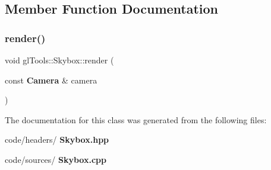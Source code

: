 \subsection{Member Function Documentation}
\mbox{\label{classgl_tools_1_1_skybox_a4e15b93af44e72e77e6128599357c161}} 
\subsubsection{render()}
{\footnotesize\ttfamily void gl\+Tools\+::\+Skybox\+::render (\begin{DoxyParamCaption}\item[{const \textbf{ Camera} \&}]{camera }\end{DoxyParamCaption})}



The documentation for this class was generated from the following files\+:\begin{DoxyCompactItemize}
\item 
code/headers/\textbf{ Skybox.\+hpp}\item 
code/sources/\textbf{ Skybox.\+cpp}\end{DoxyCompactItemize}
